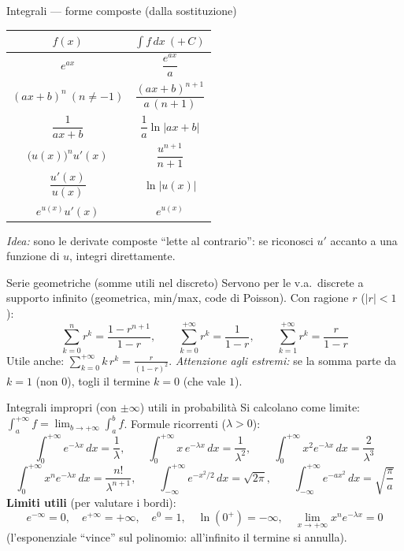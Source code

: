 \documentclass[11pt]{article}
\begin{document}
\begin{concetto}[barSlate]{Integrali --- forme composte (dalla sostituzione)}
\renewcommand{\arraystretch}{1.9}
\begin{center}
\begin{tabular}{c|c}
$f(x)$ & $\displaystyle\int f\,dx\ (+\,C)$ \\
\hline
$e^{ax}$ & $\dfrac{e^{ax}}{a}$ \\
$(ax+b)^n\ (n\neq-1)$ & $\dfrac{(ax+b)^{n+1}}{a\,(n+1)}$ \\
$\dfrac{1}{ax+b}$ & $\dfrac{1}{a}\ln|ax+b|$ \\
$\big(u(x)\big)^n u'(x)$ & $\dfrac{u^{n+1}}{n+1}$ \\
$\dfrac{u'(x)}{u(x)}$ & $\ln|u(x)|$ \\
$e^{u(x)}u'(x)$ & $e^{u(x)}$ \\
\end{tabular}
\end{center}
\renewcommand{\arraystretch}{1}
\emph{Idea:} sono le derivate composte ``lette al contrario'': se riconosci $u'$ accanto a una funzione di $u$, integri direttamente.
\end{concetto}

\begin{concetto}[barSlate]{Serie geometriche (somme utili nel discreto)}
Servono per le v.a.\ discrete a supporto infinito (geometrica, min/max, code di Poisson). Con ragione $r$ ($|r|<1$):
\[ \sum_{k=0}^{n} r^k = \frac{1-r^{n+1}}{1-r}, \qquad \sum_{k=0}^{+\infty} r^k = \frac{1}{1-r}, \qquad \sum_{k=1}^{+\infty} r^k = \frac{r}{1-r} \]
Utile anche: $\displaystyle\sum_{k=0}^{+\infty} k\,r^k = \frac{r}{(1-r)^2}$. \quad \emph{Attenzione agli estremi:} se la somma parte da $k=1$ (non $0$), togli il termine $k=0$ (che vale $1$).
\end{concetto}

\begin{concetto}[barSlate]{Integrali impropri (con $\pm\infty$) utili in probabilit\`a}
Si calcolano come limite: $\displaystyle\int_a^{+\infty} f = \lim_{b\to+\infty}\int_a^{b} f$. Formule ricorrenti ($\lambda>0$):
\[ \int_0^{+\infty} e^{-\lambda x}\,dx = \frac{1}{\lambda}, \qquad \int_0^{+\infty} x\,e^{-\lambda x}\,dx = \frac{1}{\lambda^2}, \qquad \int_0^{+\infty} x^2 e^{-\lambda x}\,dx = \frac{2}{\lambda^3} \]
\[ \int_0^{+\infty} x^n e^{-\lambda x}\,dx = \frac{n!}{\lambda^{n+1}}, \qquad \int_{-\infty}^{+\infty} e^{-x^2/2}\,dx = \sqrt{2\pi}, \qquad \int_{-\infty}^{+\infty} e^{-a x^2}\,dx = \sqrt{\frac{\pi}{a}} \]
\textbf{Limiti utili} (per valutare i bordi):
\[ e^{-\infty}=0,\quad e^{+\infty}=+\infty,\quad e^{0}=1,\quad \ln(0^+)=-\infty,\quad \lim_{x\to+\infty} x^n e^{-\lambda x}=0 \]
(l'esponenziale ``vince'' sul polinomio: all'infinito il termine si annulla).
\end{concetto}
\end{document}
